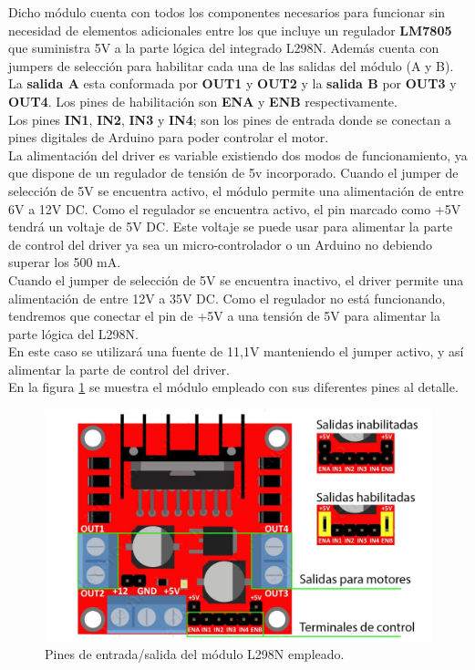 Dicho módulo cuenta con todos los componentes necesarios para funcionar sin necesidad de elementos adicionales entre los que incluye un regulador \textbf{LM7805} que suministra 5V
a la parte lógica del integrado L298N. Además cuenta con jumpers de selección para habilitar cada una de las salidas del módulo (A y B). La \textbf{salida A} esta conformada
por \textbf{OUT1} y \textbf{OUT2} y la \textbf{salida B} por \textbf{OUT3} y \textbf{OUT4}. Los pines de habilitación 
son \textbf{ENA} y \textbf{ENB} respectivamente.\\

Los pines \textbf{IN1}, \textbf{IN2}, \textbf{IN3} y \textbf{IN4}; son los pines de entrada donde se conectan a pines digitales de Arduino para poder controlar el motor.\\

La alimentación del driver es variable existiendo dos modos de funcionamiento, ya que dispone de un regulador de tensión de 5v incorporado. Cuando el jumper de selección de 5V se
encuentra activo, el módulo permite una alimentación de entre 6V a 12V DC. Como el regulador se encuentra activo, el pin marcado como +5V tendrá un voltaje de 5V DC.
Este voltaje se puede usar para alimentar la parte de control del driver ya sea un micro-controlador o un Arduino no debiendo superar los 500 mA.\\

Cuando el jumper de selección de 5V se encuentra inactivo, el driver permite una alimentación de entre 12V a 35V DC. Como el regulador no está funcionando, tendremos que conectar el pin de +5V a una tensión de 5V para alimentar la parte 
lógica del L298N.\\

En  este  caso  se  utilizará una fuente de 11,1V manteniendo el jumper activo, y así alimentar la parte de control del driver.\\

En la figura \ref{diagrama:L298N-salidas} se muestra el módulo empleado con sus diferentes pines al detalle.\\

\begin{figure}[H]
  \begin{center}
    \includegraphics[scale=2]{imagenes/L298N-conexiones.jpg}
  \end{center}
  \caption{Pines de entrada/salida del módulo L298N empleado.}
  \label{diagrama:L298N-salidas}
\end{figure}

